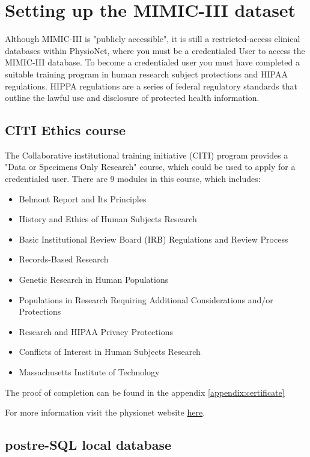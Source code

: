 \documentclass{l4proj}
\begin{document}
\section{Setting up the MIMIC-III dataset}

Although MIMIC-III is "publicly accessible", it is still a restricted-access clinical databases within PhysioNet, where you must be a credentialed User to access the MIMIC-III database. To become a credentialed user you must have completed a suitable training program in human research subject protections and HIPAA regulations. HIPPA regulations are a series of federal regulatory standards that outline the lawful use and disclosure of protected health information. 



\subsection{CITI Ethics course}

The Collaborative institutional training initiative (CITI) program provides a "Data or Specimens Only Research" course, which could be used to apply for a credentialed user. There are 9 modules in this course, which includes:

\begin{itemize}
  \item Belmont Report and Its Principles
  \item History and Ethics of Human Subjects Research 
  \item Basic Institutional Review Board (IRB) Regulations and Review Process
  \item Records-Based Research
  \item	Genetic Research in Human Populations
  \item Populations in Research Requiring Additional Considerations and/or Protections
  \item Research and HIPAA Privacy Protections
  \item Conflicts of Interest in Human Subjects Research
  \item Massachusetts Institute of Technology
\end{itemize}

The proof of completion can be found in the appendix \ref{appendix:certificate}

For more information visit the physionet website \href{https://physionet.org/about/citi-course/}{here}.
\subsection{postre-SQL local database}
\end{document}
